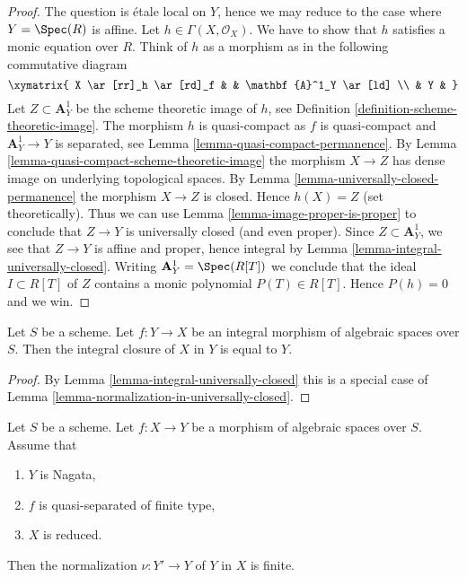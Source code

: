 \begin{proof}
The question is \'etale local on $Y$, hence we may reduce to the
case where $Y = \Spec(R)$ is affine. Let $h \in \Gamma(X, \mathcal{O}_X)$.
We have to show that $h$ satisfies a monic equation over $R$. Think of $h$
as a morphism as in the following commutative diagram
$$
\xymatrix{
X \ar[rr]_h \ar[rd]_f & & \mathbf{A}^1_Y \ar[ld] \\
& Y &
}
$$
Let $Z \subset \mathbf{A}^1_Y$ be the scheme theoretic image of $h$,
see Definition \ref{definition-scheme-theoretic-image}.
The morphism $h$ is quasi-compact as $f$ is quasi-compact and
$\mathbf{A}^1_Y \to Y$ is separated, see
Lemma \ref{lemma-quasi-compact-permanence}.
By Lemma \ref{lemma-quasi-compact-scheme-theoretic-image} the
morphism $X \to Z$ has dense image on underlying topological spaces. By
Lemma \ref{lemma-universally-closed-permanence} the morphism
$X \to Z$ is closed. Hence $h(X) = Z$ (set theoretically).
Thus we can use
Lemma \ref{lemma-image-proper-is-proper}
to conclude that $Z \to Y$ is universally closed (and even proper).
Since $Z \subset \mathbf{A}^1_Y$, we see that $Z \to Y$ is affine
and proper, hence integral by Lemma \ref{lemma-integral-universally-closed}.
Writing $\mathbf{A}^1_Y = \Spec(R[T])$ we conclude that
the ideal $I \subset R[T]$ of $Z$ contains a monic polynomial
$P(T) \in R[T]$. Hence $P(h) = 0$ and we win.
\end{proof}

\begin{lemma}
\label{lemma-normalization-in-integral}
Let $S$ be a scheme. Let $f : Y \to X$ be an integral morphism
of algebraic spaces over $S$.
Then the integral closure of $X$ in $Y$ is equal to $Y$.
\end{lemma}

\begin{proof}
By Lemma \ref{lemma-integral-universally-closed} this is a special case of
Lemma \ref{lemma-normalization-in-universally-closed}.
\end{proof}

\begin{lemma}
\label{lemma-nagata-normalization-finite}
Let $S$ be a scheme. Let $f : X \to Y$ be a morphism of algebraic spaces
over $S$. Assume that
\begin{enumerate}
\item $Y$ is Nagata,
\item $f$ is quasi-separated of finite type,
\item $X$ is reduced.
\end{enumerate}
Then the normalization $\nu : Y' \to Y$ of $Y$ in $X$ is finite.
\end{lemma}


